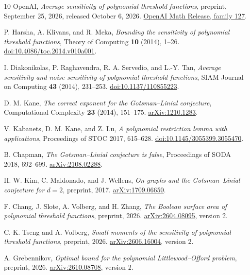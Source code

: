 \documentclass[11pt]{article}
\theoremstyle{remark}
\begin{document}
\begin{thebibliography}{10}
OpenAI, \emph{Average sensitivity of polynomial threshold functions},
preprint, September 25, 2026, released October 6, 2026.
\href{https://github.com/openai/math/blob/main/preprints/Average-Sensitivity-of-Polynomial-Threshold-Functions-September-25-2026/main.pdf}{OpenAI Math Release, family 127}.

P. Harsha, A. Klivans, and R. Meka,
\emph{Bounding the sensitivity of polynomial threshold functions},
Theory of Computing \textbf{10} (2014), 1--26.
\href{https://doi.org/10.4086/toc.2014.v010a001}{doi:10.4086/toc.2014.v010a001}.

I. Diakonikolas, P. Raghavendra, R. A. Servedio, and L.-Y. Tan,
\emph{Average sensitivity and noise sensitivity of polynomial threshold
functions}, SIAM Journal on Computing \textbf{43} (2014), 231--253.
\href{https://doi.org/10.1137/110855223}{doi:10.1137/110855223}.

D. M. Kane, \emph{The correct exponent for the Gotsman--Linial conjecture},
Computational Complexity \textbf{23} (2014), 151--175.
\href{https://arxiv.org/abs/1210.1283}{arXiv:1210.1283}.

V. Kabanets, D. M. Kane, and Z. Lu,
\emph{A polynomial restriction lemma with applications},
Proceedings of STOC 2017, 615--628.
\href{https://doi.org/10.1145/3055399.3055470}{doi:10.1145/3055399.3055470}.

B. Chapman, \emph{The Gotsman--Linial conjecture is false},
Proceedings of SODA 2018, 692--699.
\href{https://arxiv.org/abs/2108.02288}{arXiv:2108.02288}.

H. W. Kim, C. Maldonado, and J. Wellens,
\emph{On graphs and the Gotsman--Linial conjecture for $d=2$},
preprint, 2017.
\href{https://arxiv.org/abs/1709.06650}{arXiv:1709.06650}.

F. Chang, J. Slote, A. Volberg, and H. Zhang,
\emph{The Boolean surface area of polynomial threshold functions},
preprint, 2026.
\href{https://arxiv.org/abs/2604.08095}{arXiv:2604.08095}, version 2.

C.-K. Tseng and A. Volberg,
\emph{Small moments of the sensitivity of polynomial threshold functions},
preprint, 2026.
\href{https://arxiv.org/abs/2606.16004}{arXiv:2606.16004}, version 2.

A. Grebennikov, \emph{Optimal bound for the polynomial Littlewood--Offord
problem}, preprint, 2026.
\href{https://arxiv.org/abs/2610.08708}{arXiv:2610.08708}, version 2.
\end{thebibliography}
\end{document}
